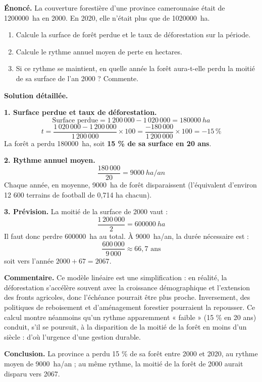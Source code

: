\documentclass[11pt]{article}
\begin{document}
\begin{exoresolu}
\textbf{Énoncé.} La couverture forestière d'une province camerounaise était de \SI{1200000}{ha} en 2000. En 2020, elle n'était plus que de \SI{1020000}{ha}.
\begin{enumerate}
\item Calcule la surface de forêt perdue et le taux de déforestation sur la période.
\item Calcule le rythme annuel moyen de perte en hectares.
\item Si ce rythme se maintient, en quelle année la forêt aura-t-elle perdu la moitié de sa surface de l'an 2000 ? Commente.
\end{enumerate}
\tcblower
\textbf{Solution détaillée.}

\textbf{1. Surface perdue et taux de déforestation.}
\[ \text{Surface perdue} = 1\,200\,000 - 1\,020\,000 = \SI{180000}{ha} \]
\[ t = \frac{1\,020\,000 - 1\,200\,000}{1\,200\,000} \times 100 = \frac{-180\,000}{1\,200\,000} \times 100 = -15\,\% \]
La forêt a perdu \SI{180000}{ha}, soit \textbf{15 \% de sa surface en 20 ans}.

\textbf{2. Rythme annuel moyen.}
\[ \frac{180\,000}{20} = \SI{9000}{ha/an} \]
Chaque année, en moyenne, \SI{9000}{ha} de forêt disparaissent (l'équivalent d'environ 12 600 terrains de football de 0,714 ha chacun).

\textbf{3. Prévision.} La moitié de la surface de 2000 vaut :
\[ \frac{1\,200\,000}{2} = \SI{600000}{ha} \]
Il faut donc perdre \SI{600000}{ha} au total. À \SI{9000}{ha/an}, la durée nécessaire est :
\[ \frac{600\,000}{9\,000} \approx 66{,}7 \text{ ans} \]
soit vers l'année $2000 + 67 = 2067$.

\textbf{Commentaire.} Ce modèle linéaire est une simplification : en réalité, la déforestation s'accélère souvent avec la croissance démographique et l'extension des fronts agricoles, donc l'échéance pourrait être plus proche. Inversement, des politiques de reboisement et d'aménagement forestier pourraient la repousser. Ce calcul montre néanmoins qu'un rythme apparemment « faible » (15 \% en 20 ans) conduit, s'il se poursuit, à la disparition de la moitié de la forêt en moins d'un siècle : d'où l'urgence d'une gestion durable.

\textbf{Conclusion.} La province a perdu 15 \% de sa forêt entre 2000 et 2020, au rythme moyen de \SI{9000}{ha/an} ; au même rythme, la moitié de la forêt de 2000 aurait disparu vers 2067.
\end{exoresolu}
\end{document}
